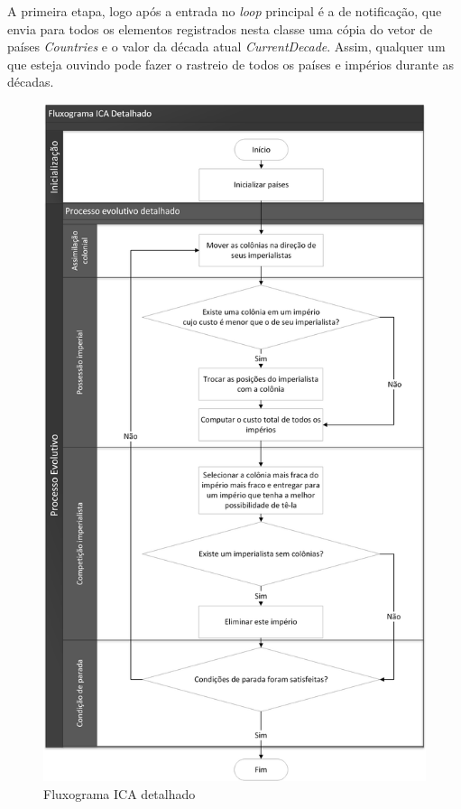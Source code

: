 A primeira etapa, logo após a entrada no \emph{loop} principal é a de notificação, que envia para todos os elementos registrados nesta classe uma cópia do vetor de países \emph{Countries} e o valor da década atual \emph{CurrentDecade}. Assim, qualquer um que esteja ouvindo pode fazer o rastreio de todos os países e impérios durante as décadas.

 \begin{figure}[h]
	\centering	
	\includegraphics[scale=0.5]{Figuras/Fluxograms-ICACanocicDetailed.png}
	\caption{Fluxograma ICA detalhado}
	\label{fig:Fluxograms-ICACanocicDetailed}
	\end{figure}
	
